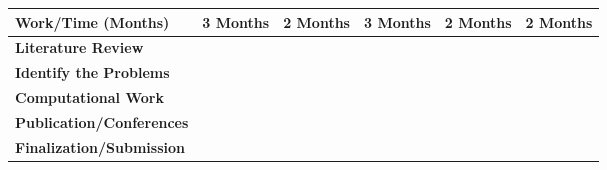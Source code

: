 \begin{table}[H]
\centering
\renewcommand{\arraystretch}{1.5}
\begin{tabular}{|>{\centering\arraybackslash}m{5cm}|c|c|c|c|c|}
\hline
\textbf{Work/Time (Months)} & \textbf{3 Months} & \textbf{2 Months} & \textbf{3 Months} & \textbf{2 Months} & \textbf{2 Months} \\

\hline
\textbf{Literature Review} & \cellcolor{gray} &  &  &  &  \\

\hline
\textbf{Identify the Problems} &  & \cellcolor{gray} &  &  &  \\

\hline
\textbf{Computational Work} &  &  & \cellcolor{gray} &  &  \\
\hline
\textbf{Publication/Conferences} &  &  &  & \cellcolor{gray} & \\
\hline
\textbf{Finalization/Submission} &  &  &  &  & \cellcolor{gray} \\
\hline
\end{tabular}
\end{table}